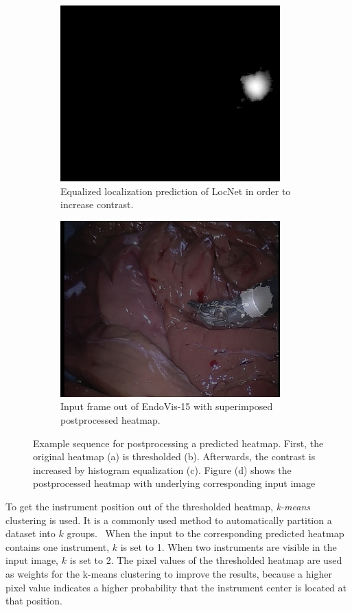 \begin{figure}
\begin{subfigure}[t]{0.49\textwidth}
\centering
\includegraphics[width=.65\textwidth]{images/predictions/model1/thresholded-frame001-Dataset2/THRESHOLD_and_equalized_Dataset2.jpg}
\caption{Equalized localization prediction of LocNet in order to increase contrast.}
\label{img:histogr_pred_loc_model01}
\end{subfigure}
\begin{subfigure}[t]{0.49\textwidth}
\centering
\includegraphics[width=.65\textwidth]{images/predictions/model1/thresholded-frame001-Dataset2/superimposed_preproc_heatmap_frame001.png}
\caption{Input frame out of EndoVis-15 with superimposed postprocessed heatmap.}
\label{img:superimposed_heatmap_thresh_model01}
\end{subfigure}
\caption[Postprocessing steps predicted heatmap]{Example sequence for postprocessing a predicted heatmap. First, the original heatmap (a) is thresholded (b). Afterwards, the contrast is increased by histogram equalization (c). Figure (d) shows the postprocessed heatmap with underlying corresponding input image}
\label{img:threshold_steps}
\end{figure}

To get the instrument position out of the thresholded heatmap, \emph{k-means} clustering is used. It is a commonly used method to automatically partition a dataset into $k$ groups.~\cite{k-means-paper2005sipkins}
When the input to the corresponding predicted heatmap contains one instrument, $k$ is set to 1. When two instruments are visible in the input image, $k$ is set to 2.
The pixel values of the thresholded heatmap are used as weights for the k-means clustering to improve the results, because a higher pixel value indicates a higher probability that the instrument center is located at that position.

